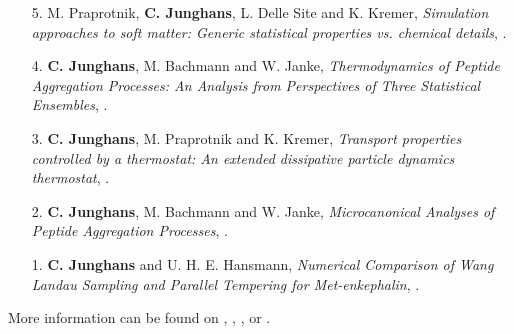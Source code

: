 \documentclass{article}
\begin{document}
\begin{enumerate}
\item[5.] M. Praprotnik, \textbf{C. Junghans}, L. Delle Site and K. Kremer,
  \textit{Simulation approaches to soft matter: Generic statistical properties vs. chemical details},
  .

\item[4.] \textbf{C. Junghans}, M. Bachmann and W. Janke,
  \textit{Thermodynamics of Peptide Aggregation Processes: An Analysis from Perspectives of Three Statistical Ensembles},
   .

\item[3.] \textbf{C. Junghans}, M. Praprotnik and K. Kremer,
  \textit{Transport properties controlled by a thermostat: An extended dissipative particle dynamics thermostat},
  .

\item[2.] \textbf{C. Junghans}, M. Bachmann and W. Janke,
  \textit{Microcanonical Analyses of Peptide Aggregation Processes},
  .

\item[1.] \textbf{C. Junghans} and U. H. E. Hansmann,
  \textit{Numerical Comparison of Wang Landau Sampling and Parallel Tempering for Met-enkephalin}, 
  .
\end{enumerate}

More information can be found on , , ,  or .
\end{document}
